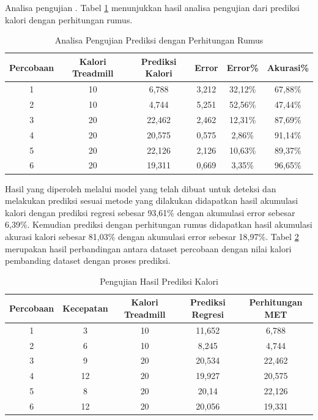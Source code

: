 Analisa pengujian \lipsum[1][1-4]. Tabel \ref{tb:AnalisaPrediksiPerhitungan} menunjukkan hasil analisa pengujian dari prediksi kalori dengan perhitungan rumus.

\begin{longtable}{|c|c|c|c|c|c|}
  \caption{Analisa Pengujian Prediksi dengan Perhitungan Rumus}
  \label{tb:AnalisaPrediksiPerhitungan}                                   \\
  \hline
  \rowcolor[HTML]{C0C0C0}
  \textbf{Percobaan} & \textbf{Kalori Treadmill} & \textbf{Prediksi Kalori} & \textbf{Error} & \textbf{Error\%} & \textbf{Akurasi\%} \\
  \hline
  1   & 10   & 6,788 & 3,212    & 32,12\%     & 67,88\%   \\
  \hline
  2   & 10   & 4,744 & 5,251    & 52,56\%     & 47,44\%   \\
  \hline
  3   & 20   & 22,462 & 2,462   & 12,31\%     & 87,69\%   \\
  \hline
  4   & 20   & 20,575 & 0,575   & 2,86\%      & 91,14\%   \\
  \hline
  5   & 20   & 22,126 & 2,126   & 10,63\%     & 89,37\%   \\
  \hline
  6   & 20   & 19,311 & 0,669   & 3,35\%      & 96,65\%   \\
  \hline
\end{longtable}

Hasil yang diperoleh melalui model yang telah dibuat untuk deteksi dan melakukan prediksi sesuai metode yang dilakukan didapatkan hasil akumulasi kalori dengan prediksi regresi sebesar 93,61\% dengan akumulasi error sebesar 6,39\%. Kemudian prediksi dengan perhitungan rumus didapatkan hasil akumulasi akurasi kalori sebesar 81,03\% dengan akumulasi error sebesar 18,97\%. Tabel \ref{tb:PengujianPrediksi} merupakan hasil perbandingan antara dataset percobaan dengan nilai kalori pembanding dataset dengan proses prediksi.

\begin{longtable}{|c|c|c|c|c|}
  \caption{Pengujian Hasil Prediksi Kalori}
  \label{tb:PengujianPrediksi}                                   \\
  \hline
  \rowcolor[HTML]{C0C0C0}
  \textbf{Percobaan} & \textbf{Kecepatan} & \textbf{Kalori Treadmill} & \textbf{Prediksi Regresi} & \textbf{Perhitungan MET} \\
  \hline
  1   & 3     & 10    & 11,652    & 6,788   \\
  \hline
  2   & 6     & 10    & 8,245     & 4,744   \\
  \hline
  3   & 9     & 20    & 20,534    & 22,462   \\
  \hline
  4   & 12    & 20    & 19,927    & 20,575   \\
  \hline
  5   & 8     & 20    & 20,14     & 22,126   \\
  \hline
  6   & 12    & 20    & 20,056    & 19,331   \\
  \hline
\end{longtable}